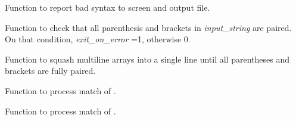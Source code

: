 \documentclass[letterpaper,10pt,english]{sphinxmanual}
\begin{document}
\begin{fulllineitems}
\label{index:input.bad_option_syntax}
Function to report bad syntax to screen and output file.

\end{fulllineitems}


\begin{fulllineitems}
\label{index:input.check_parentheses_and_brackets}
Function to check that all parenthesis and brackets
in \emph{input\_string} are paired. On that condition, \emph{exit\_on\_error} =1,
otherwise 0.

\end{fulllineitems}


\begin{fulllineitems}
\label{index:input.parse_multiline_array}
Function to squash multiline arrays into a single line
until all parentheses and brackets are fully paired.

\end{fulllineitems}


\begin{fulllineitems}
\label{index:input.process_basis_block}
Function to process match of .

\end{fulllineitems}


\begin{fulllineitems}
\label{index:input.process_basis_file}
Function to process match of .

\end{fulllineitems}

\end{document}
